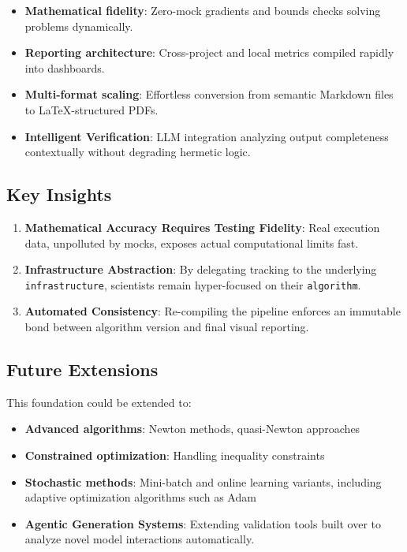 \documentclass[
]{article}
\providecommand{\tightlist}{%
  \setlength{\itemsep}{0pt}\setlength{\parskip}{0pt}}
\begin{document}
\begin{itemize}
\tightlist
\item
  \textbf{Mathematical fidelity}: Zero-mock gradients and bounds checks
  solving problems dynamically.
\item
  \textbf{Reporting architecture}: Cross-project and local metrics
  compiled rapidly into dashboards.
\item
  \textbf{Multi-format scaling}: Effortless conversion from semantic
  Markdown files to LaTeX-structured PDFs.
\item
  \textbf{Intelligent Verification}: LLM integration analyzing output
  completeness contextually without degrading hermetic logic.
\end{itemize}

\subsection{Key Insights}\label{key-insights}

\begin{enumerate}
\def\labelenumi{\arabic{enumi}.}
\tightlist
\item
  \textbf{Mathematical Accuracy Requires Testing Fidelity}: Real
  execution data, unpolluted by mocks, exposes actual computational
  limits fast.
\item
  \textbf{Infrastructure Abstraction}: By delegating tracking to the
  underlying \texttt{infrastructure}, scientists remain hyper-focused on
  their \texttt{algorithm}.
\item
  \textbf{Automated Consistency}: Re-compiling the pipeline enforces an
  immutable bond between algorithm version and final visual reporting.
\end{enumerate}

\subsection{Future Extensions}\label{future-extensions}

This foundation could be extended to:

\begin{itemize}
\tightlist
\item
  \textbf{Advanced algorithms}: Newton methods, quasi-Newton approaches
\item
  \textbf{Constrained optimization}: Handling inequality constraints
\item
  \textbf{Stochastic methods}: Mini-batch and online learning variants,
  including adaptive optimization algorithms such as Adam
  \citep{kingma2014adam}
\item
  \textbf{Agentic Generation Systems}: Extending validation tools built
  over  to analyze novel model
  interactions automatically.
\end{itemize}
\end{document}
